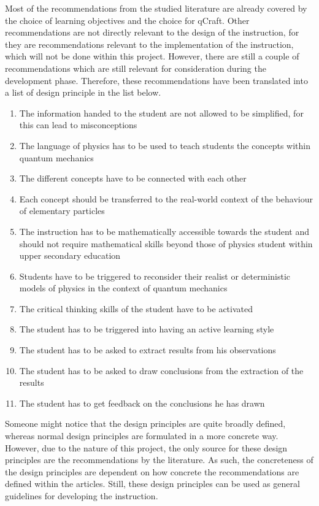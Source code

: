 \documentclass[11pt,twoside]{report} %
\begin{document}
Most of the recommendations from the studied literature are already covered by the choice of learning objectives and the choice for qCraft. Other recommendations are not directly relevant to the design of the instruction, for they are recommendations relevant to the implementation of the instruction, which will not be done within this project. However, there are still a couple of recommendations which are still relevant for consideration during the development phase. Therefore, these recommendations have been translated into a list of design principle in the list below.

\begin{enumerate}
\item \label{itm:simple}The information handed to the student are not allowed to be simplified, for this can lead to misconceptions
\item \label{itm:language} The language of physics has to be used to teach students the concepts within quantum mechanics
\item \label{itm:links}The different concepts have to be connected with each other
\item \label{itm:realworld}Each concept should be transferred to the real-world context of the behaviour of elementary particles
\item \label{itm:maths}The instruction has to be mathematically accessible towards the student and should not require mathematical skills beyond those of physics student within upper secondary education
\item \label{itm:models}Students have to be triggered to reconsider their realist or deterministic models of physics in the context of quantum mechanics
\item \label{itm:critic}The critical thinking skills of the student have to be activated
\item \label{itm:active}The student has to be triggered into having an active learning style
\item \label{itm:results}The student has to be asked to extract results from his observations
\item \label{itm:conclusions}The student has to be asked to draw conclusions from the extraction of the results
\item \label{itm:feedback}The student has to get feedback on the conclusions he has drawn
\end{enumerate}

Someone might notice that the design principles are quite broadly defined, whereas normal design principles are formulated in a more concrete way. However, due to the nature of this project, the only source for these design principles are the recommendations by the literature. As such, the concreteness of the design principles are dependent on how concrete the recommendations are defined within the articles. Still, these design principles can be used as general guidelines for developing the instruction.
\end{document}
